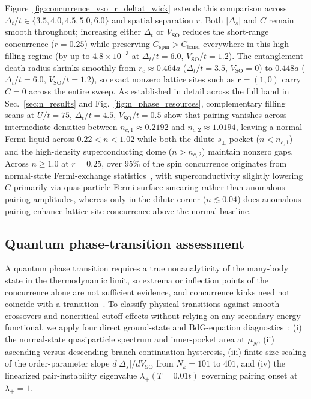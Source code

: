 \documentclass[aps,prb,twocolumn,superscriptaddress,longbibliography]{revtex4-2}
\begin{document}
Figure~\ref{fig:concurrence_vso_r_deltat_wick} extends this comparison across
$\Delta_t/t\in\{3.5,4.0,4.5,5.0,6.0\}$ and spatial separation $r$. Both
$|\Delta_s|$ and $C$ remain smooth throughout; increasing either $\Delta_t$
or $V_{\mathrm{SO}}$ reduces the short-range concurrence ($r=0.25$) while
preserving $C_{\mathrm{spin}} > C_{\mathrm{band}}$ everywhere in this
high-filling regime (by up to $4.8\times 10^{-3}$ at $\Delta_t/t=6.0$,
$V_{\mathrm{SO}}/t=1.2$). The entanglement-death radius shrinks smoothly
from $r_c\approx 0.464a$ ($\Delta_t/t=3.5$, $V_{\mathrm{SO}}=0$) to
$0.448a$ ($\Delta_t/t=6.0$, $V_{\mathrm{SO}}/t=1.2$), so exact nonzero
lattice sites such as $\mathbf{r}=(1,0)$ carry $C=0$ across the entire
sweep. As established in detail across the full band in Sec.~\ref{sec:n_results}
and Fig.~\ref{fig:n_phase_resources}, complementary filling scans at $U/t=75$, $\Delta_t/t=4.5$,
$V_{\mathrm{SO}}/t=0.5$ show that pairing vanishes across intermediate densities
between $n_{c,1}\approx 0.2192$ and $n_{c,2}\approx 1.0194$, leaving a normal
Fermi liquid across $0.22 < n < 1.02$ while both the dilute $s_{\pm}$ pocket ($n<n_{c,1}$)
and the high-density superconducting dome ($n > n_{c,2}$) maintain nonzero gaps.
Across $n\ge 1.0$ at $r=0.25$, over $95\%$ of the
spin concurrence originates from normal-state Fermi-exchange statistics~\cite{Oh2004,Oh2005},
with superconductivity slightly lowering $C$ primarily via quasiparticle
Fermi-surface smearing rather than anomalous pairing amplitudes, whereas
only in the dilute corner ($n\lesssim 0.04$) does anomalous pairing enhance
lattice-site concurrence above the normal baseline.

\subsection{Quantum phase-transition assessment}
\label{sec:qpt}

A quantum phase transition requires a true nonanalyticity of the
many-body state in the thermodynamic limit, so extrema or inflection points
of the concurrence alone are not sufficient evidence, and concurrence kinks
need not coincide with a transition~\cite{Osterloh2002,Yang2005,YuEberly2009}.
To classify physical transitions against smooth crossovers and noncritical
cutoff effects without relying on any secondary energy functional, we apply
four direct ground-state and BdG-equation diagnostics~\cite{Hutchinson2018}:
(i) the normal-state quasiparticle spectrum and inner-pocket area
at $\mu_N$, (ii) ascending versus descending branch-continuation hysteresis,
(iii) finite-size scaling of the order-parameter slope $d|\Delta_s|/dV_{\mathrm{SO}}$
from $N_k=101$ to $401$, and (iv) the linearized pair-instability
eigenvalue $\lambda_+(T=0.01t)$ governing pairing onset at $\lambda_+=1$.
\end{document}
